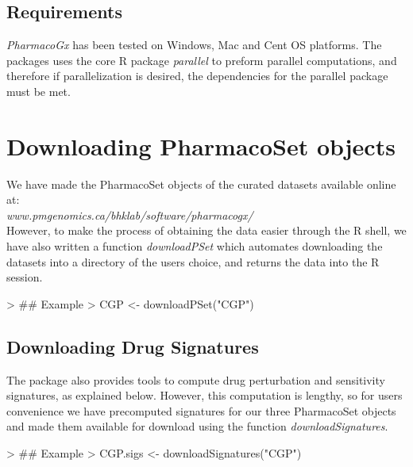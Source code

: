 \documentclass[11pt]{article}
\begin{document}
\subsection*{Requirements}

\textit{PharmacoGx} has been tested on Windows, Mac and Cent OS platforms. The packages uses the core R package \textit{parallel} to preform parallel computations, and therefore if parallelization is desired, the dependencies for the parallel package must be met. 

\section{Downloading PharmacoSet objects}

We have made the PharmacoSet objects of the curated datasets available online at:\\ \textit{www.pmgenomics.ca/bhklab/software/pharmacogx/}\\

However, to make the process of obtaining the data easier through the R shell, we have also written a function \textit{downloadPSet} which automates downloading the datasets into a directory of the users choice, and returns the data into the R session. 

\begin{Schunk}
\begin{Sinput}
> ## Example
> CGP <- downloadPSet("CGP") 
\end{Sinput}
\end{Schunk}
\subsection*{Downloading Drug Signatures}

The package also provides tools to compute drug perturbation and sensitivity signatures, as explained below. However, this computation is lengthy, so for users convenience we have precomputed signatures for our three PharmacoSet objects and made them available for download using the function \textit{downloadSignatures}.

\begin{Schunk}
\begin{Sinput}
> ## Example
> CGP.sigs <- downloadSignatures("CGP")
\end{Sinput}
\end{Schunk}
\end{document}
